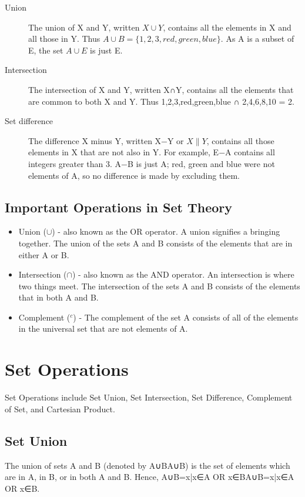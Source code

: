 \begin{description}
\item[Union]
The union of X and Y, written $X\cup Y$, contains all the elements in X and all those in Y. Thus $A \cup B = \{1, 2, 3, red, green, blue\}$. As A is a subset of E, the set $A \cup E$ is just E.

\item[Intersection]

The intersection of X and Y, written X∩Y, contains all the elements that are common to both X and Y. Thus {1,2,3,red,green,blue} ∩ {2,4,6,8,10} = {2}.

\item[Set difference]

The difference X minus Y, written X−Y or $X\|Y$, contains all those elements in X that are not also in Y. For example, E−A contains all integers greater than 3. A−B is just A; red, green and blue were not elements of A, so no difference is made by excluding them.
\end{description}


\subsection{Important Operations in Set Theory}

\begin{itemize}
\item Union ($\cup$) - also known as the OR operator. A union signifies a bringing together. The union of the sets A and B consists of the elements that are in either A or B.
\item Intersection ($\cap$) - also known as the AND operator. An intersection is where two things meet. The intersection of the sets A and B consists of the elements that in both A and B.
\item Complement ($^{c}$) - The complement of the set A consists of all of the elements in the universal set that are not elements of A.
\end{itemize}


\section{Set Operations}
Set Operations include Set Union, Set Intersection, Set Difference, Complement of Set, and Cartesian Product.

\subsection{Set Union}
The union of sets A and B (denoted by A∪BA∪B) is the set of elements which are in A, in B, or in both A and B. Hence, A∪B={x|x∈A OR x∈B}A∪B={x|x∈A OR x∈B}.

